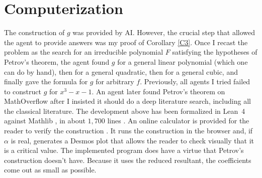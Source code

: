 \documentclass[10pt]{article}
\theoremstyle{plain}
\theoremstyle{remark}
\theoremstyle{plain}
\begin{document}
\section{Computerization}\label{Sformal}

The construction of $g$ was provided by AI. However, the crucial step that
allowed the agent to provide answers was my proof of Corollary \ref{C3}. Once I
recast the problem as the search for an irreducible polynomial $F$ satisfying
the hypotheses of Petrov's theorem, the agent found $g$ for a general linear
polynomial (which one can do by hand), then for a general quadratic, then for a
general cubic, and finally gave the formula for $g$ for arbitrary $f$.
Previously, all agents I tried failed to construct $g$ for $x^{3}-x-1$.
An agent later found Petrov's theorem on MathOverflow after I insisted it
should do a deep literature search, including all the classical literature.
The development above has been formalized in Lean~4 \cite{lean4} against
Mathlib \cite{mathlib}, in about $1{,}700$ lines \cite{repo}. An online
calculator is provided for the reader to verify the construction \cite{app}. It
runs the construction in the browser and, if $\alpha$ is real, generates a
Desmos plot that allows the reader to check visually that it is a critical
value. The implemented program does have a virtue that Petrov's construction
doesn't have. Because it uses the reduced resultant, the coefficients come out
as small as possible.
\end{document}
